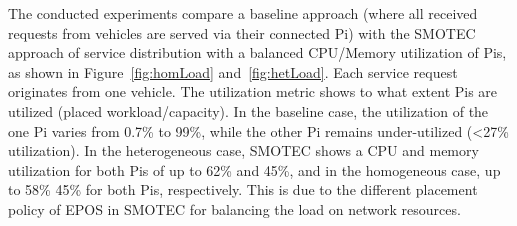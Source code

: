 \documentclass[conference]{IEEEtran}
\begin{document}
\par The conducted experiments compare a baseline approach (where all received requests from vehicles are served via their connected Pi) with the SMOTEC approach of service distribution with a balanced CPU/Memory utilization of Pis, as shown in Figure~\ref{fig:homLoad} and~\ref{fig:hetLoad}. Each service request originates from one vehicle. The utilization metric shows to what extent Pis are utilized (placed workload/capacity). In the baseline case, the utilization of the one Pi varies from 0.7\% to 99\%, while the other Pi remains under-utilized (<27\% utilization). In the heterogeneous case, SMOTEC shows a CPU and memory utilization for both Pis of up to 62\% and 45\%, and in the homogeneous case, up to 58\% 45\% for both Pis, respectively. This is due to the different placement policy of EPOS in SMOTEC for balancing the load on network resources.
\end{document}
